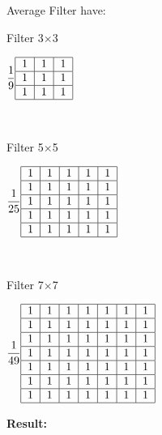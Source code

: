 Average Filter have: 
\begin{center}
	Filter 3$\times$3

$\dfrac{1}{9}\begin{tabular}{|c|c|c|}
\hline 
1 & 1 & 1 \\ 
\hline 
1 & 1 & 1 \\ 
\hline 
1 & 1 & 1 \\ 
\hline 
\end{tabular}$ 	
\end{center}

\

\begin{center}
		Filter 5$\times$5
	
	$\dfrac{1}{25}\begin{tabular}{|c|c|c|c|c|}
		\hline 
		1 & 1 & 1 & 1 & 1 \\ 
		\hline 
		1 & 1 & 1 & 1 & 1 \\ 
		\hline 
		1 & 1 & 1 & 1 & 1 \\ 
		\hline 
		1 & 1 & 1 & 1 & 1 \\ 
		\hline 
		1 & 1 & 1 & 1 & 1 \\ 
		\hline 
	\end{tabular} $
\end{center}

\

\begin{center}
	Filter 7$\times$7

$\dfrac{1}{49}\begin{tabular}{|c|c|c|c|c|c|c|}
	\hline 
	1 & 1 & 1 & 1 & 1 & 1 & 1 \\ 
	\hline 
	1 & 1 & 1 & 1 & 1 & 1 & 1 \\ 
	\hline 
	1 & 1 & 1 & 1 & 1 & 1 & 1 \\ 
	\hline 
	1 & 1 & 1 & 1 & 1 & 1 & 1 \\ 
	\hline 
	1 & 1 & 1 & 1 & 1 & 1 & 1 \\ 
	\hline 
	1 & 1 & 1 & 1 & 1 & 1 & 1 \\ 
	\hline 
	1 & 1 & 1 & 1 & 1 & 1 & 1 \\ 
	\hline 
\end{tabular} $
\end{center}
\vspace{1cm}


\textbf{Result:}

